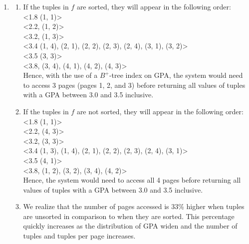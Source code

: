 \begin{enumerate}[label={(\alph*)}]
    \item 
            \begin{enumerate}[label={\arabic*.}]
                \item If the tuples in $f$ are sorted, they will appear in the following order:\\
                    <1.8 (1, 1)> \\
                    <2.2, (1, 2)> \\
                    <3.2, (1, 3)> \\
                    <3.4 (1, 4), (2, 1), (2, 2), (2, 3), (2, 4), (3, 1), (3, 2)> \\
                    <3.5 (3, 3)> \\
                    <3.8, (3, 4), (4, 1), (4, 2), (4, 3)> \\
                    \noindent Hence, with the use of a $B^+$-tree index on GPA, the system would need to access 3 pages (pages 1, 2, and 3) before returning all values of tuples with a GPA between 3.0 and 3.5 inclusive.
                \item If the tuples in $f$ are not sorted, they will appear in the following order:\\
                        <1.8 (1, 1)> \\
                        <2.2, (4, 3)> \\
                        <3.2, (3, 3)> \\
                        <3.4 (1, 3), (1, 4), (2, 1), (2, 2), (2, 3), (2, 4), (3, 1)> \\
                        <3.5 (4, 1)> \\
                        <3.8, (1, 2), (3, 2), (3, 4), (4, 2)> \\
                    \noindent Hence, the system would need to access all 4 pages before returning all values of tuples with a GPA between 3.0 and 3.5 inclusive.
                \item We realize that the number of pages accessed is 33\% higher when tuples are unsorted in comparison to when they are sorted. This percentage quickly increases as the distribution of GPA widen and the number of tuples and tuples per page increases.
            \end{enumerate}
\end{enumerate}